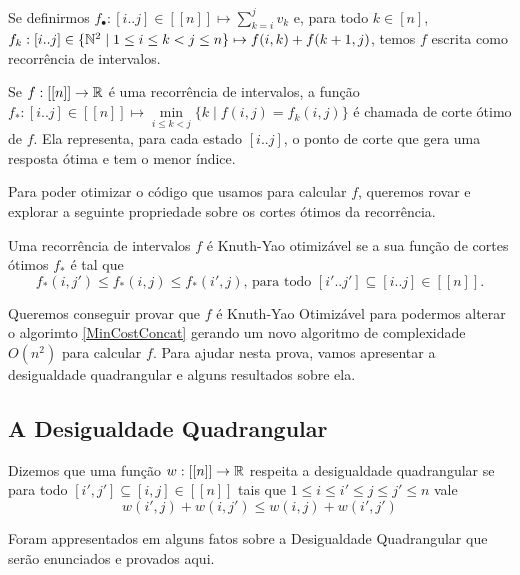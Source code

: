 Se definirmos $f_\bullet : [i..j] \in [[n]] \mapsto \sum\limits_{k=i}^j v_k$ e, para todo $k \in [n]$, $f_k : [i..j] \in \{ \mathbb{N}^2 \mid 1 \leq i \leq k < j \leq n \} \mapsto f(i,k) + f(k+1,j)$, temos $f$ escrita como recorrência de intervalos.

\begin{defi}
Se $f : [[n]] \to \mathbb{R}$ é uma recorrência de intervalos, a função $f_* : [i..j] \in [[n]] \mapsto \min\limits_{i \leq k < j} \Big\{ k \mid f(i,j) = f_k(i,j) \Big\}$ é chamada de corte ótimo de $f$. Ela representa, para cada estado $[i..j]$, o ponto de corte que gera uma resposta ótima e tem o menor índice. 
\end{defi}

Para poder otimizar o código que usamos para calcular $f$, queremos rovar e explorar a seguinte propriedade sobre os cortes ótimos da recorrência.

\begin{defi} \label{knuthyao}
Uma recorrência de intervalos $f$ é Knuth-Yao otimizável se a sua função de cortes ótimos $f_*$ é tal que
$$f_*(i,j') \leq f_*(i,j) \leq f_*(i',j) \text{, para todo } [i'..j'] \subseteq [i..j] \in [[n]] \text{.}$$
\end{defi}

Queremos conseguir provar que $f$ é Knuth-Yao Otimizável para podermos alterar o algorimto \ref{MinCostConcat} gerando um novo algoritmo de complexidade $O(n^2)$ para calcular $f$. Para ajudar nesta prova, vamos apresentar a desigualdade quadrangular e alguns resultados sobre ela. \\


\subsection{A Desigualdade Quadrangular}

\begin{defi} \label{qi}
Dizemos que uma função $w : [[n]] \to \mathbb{R}$ respeita a desigualdade quadrangular se para todo  $[i',j'] \subseteq [i,j] \in [[n]]$ tais que $1 \leq i \leq i' \leq j \leq j' \leq n$ vale
$$ w(i',j) + w(i,j') \leq w(i,j) + w(i',j') $$
\end{defi}

Foram appresentados em \cite{Yao:1980} alguns fatos sobre a Desigualdade Quadrangular que serão enunciados e provados aqui.

